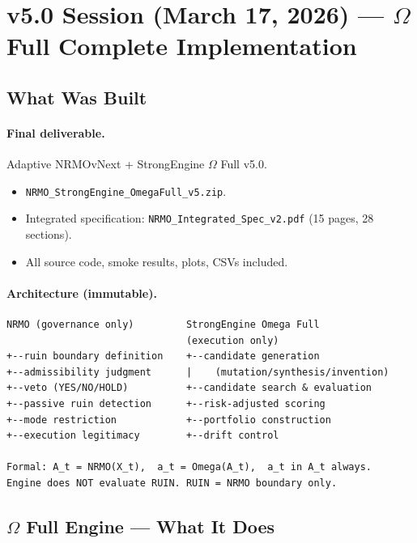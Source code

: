 \section{v5.0 Session (March 17, 2026) ---
$\Omega$ Full Complete Implementation}
\label{sec:methodology-v50-session}

\subsection{What Was Built}
\label{sec:methodology-v50-deliverable}

\paragraph{Final deliverable.}
Adaptive NRMOvNext + StrongEngine $\Omega$ Full v5.0.

\begin{itemize}
\item \texttt{NRMO\_StrongEngine\_OmegaFull\_v5.zip}.
\item Integrated specification:
\texttt{NRMO\_Integrated\_Spec\_v2.pdf} (15 pages, 28 sections).
\item All source code, smoke results, plots, CSVs included.
\end{itemize}

\paragraph{Architecture (immutable).}

\begin{lstlisting}[basicstyle=\ttfamily\scriptsize,frame=single]
NRMO (governance only)         StrongEngine Omega Full
                               (execution only)
+--ruin boundary definition    +--candidate generation
+--admissibility judgment      |    (mutation/synthesis/invention)
+--veto (YES/NO/HOLD)          +--candidate search & evaluation
+--passive ruin detection      +--risk-adjusted scoring
+--mode restriction            +--portfolio construction
+--execution legitimacy        +--drift control

Formal: A_t = NRMO(X_t),  a_t = Omega(A_t),  a_t in A_t always.
Engine does NOT evaluate RUIN. RUIN = NRMO boundary only.
\end{lstlisting}

\subsection{$\Omega$ Full Engine --- What It Does}
\label{sec:methodology-v50-engine}

